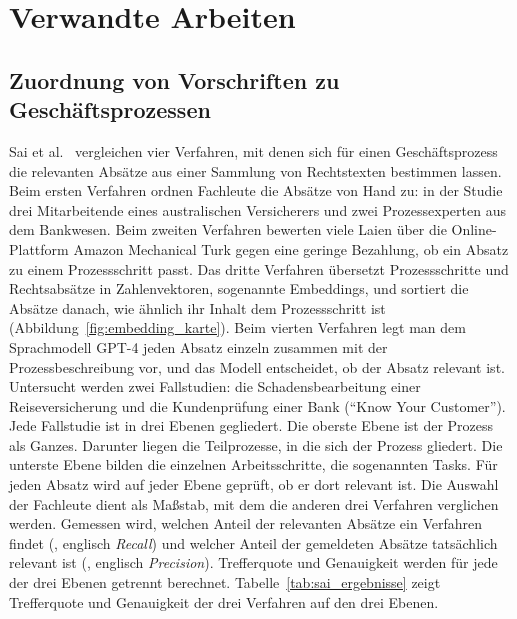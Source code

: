 \section{Verwandte Arbeiten}\label{ch:verwandte_arbeiten}
\subsection{Zuordnung von Vorschriften zu Geschäftsprozessen}\label{sec:sai}
Sai et al.~\cite{sai2024} vergleichen vier Verfahren, mit denen sich für einen Geschäftsprozess die relevanten Absätze aus einer Sammlung von Rechtstexten bestimmen lassen.
Beim ersten Verfahren ordnen Fachleute die Absätze von Hand zu: in der Studie drei Mitarbeitende eines australischen Versicherers und zwei Prozessexperten aus dem Bankwesen.
Beim zweiten Verfahren bewerten viele Laien über die Online-Plattform Amazon Mechanical Turk gegen eine geringe Bezahlung, ob ein Absatz zu einem Prozessschritt passt.
Das dritte Verfahren übersetzt Prozessschritte und Rechtsabsätze in Zahlenvektoren, sogenannte Embeddings, und sortiert die Absätze danach, wie ähnlich ihr Inhalt dem Prozessschritt ist (Abbildung~\ref{fig:embedding_karte}).
Beim vierten Verfahren legt man dem Sprachmodell GPT-4 jeden Absatz einzeln zusammen mit der Prozessbeschreibung vor, und das Modell entscheidet, ob der Absatz relevant ist.
Untersucht werden zwei Fallstudien: die Schadensbearbeitung einer Reiseversicherung und die Kundenprüfung einer Bank (\enquote{Know Your Customer}).
Jede Fallstudie ist in drei Ebenen gegliedert.
Die oberste Ebene ist der Prozess als Ganzes.
Darunter liegen die Teilprozesse, in die sich der Prozess gliedert.
Die unterste Ebene bilden die einzelnen Arbeitsschritte, die sogenannten Tasks.
Für jeden Absatz wird auf jeder Ebene geprüft, ob er dort relevant ist.
Die Auswahl der Fachleute dient als Maßstab, mit dem die anderen drei Verfahren verglichen werden.
Gemessen wird, welchen Anteil der relevanten Absätze ein Verfahren findet (, englisch \emph{Recall}) und welcher Anteil der gemeldeten Absätze tatsächlich relevant ist (, englisch \emph{Precision}).
Trefferquote und Genauigkeit werden für jede der drei Ebenen getrennt berechnet.
Tabelle~\ref{tab:sai_ergebnisse} zeigt Trefferquote und Genauigkeit der drei Verfahren auf den drei Ebenen.
